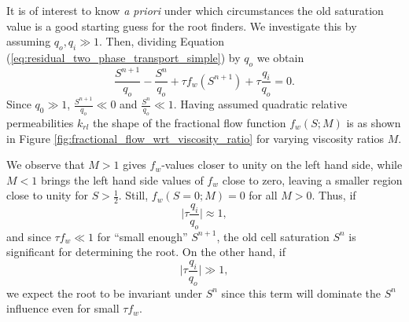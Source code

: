 It is of interest to know \emph{a priori} under which circumstances the old saturation value is a good starting guess for the root finders. We investigate this by assuming $q_o, q_i \gg 1$. Then, dividing Equation (\ref{eq:residual_two_phase_transport_simple}) by $q_o$ we obtain
\begin{equation*}
\frac{S^{n+1}}{q_o} - \frac{S^n}{q_o} + \tau f_w(S^{n+1}) + \tau \frac{q_i}{q_o} = 0.
\end{equation*}
Since $q_0 \gg 1$, $\frac{S^{n+1}}{q_o} \ll 0$ and $\frac{S^n}{q_o} \ll 1$. Having assumed quadratic relative permeabilities $k_{rl}$ the shape of the fractional flow function $f_w(S;M)$ is as shown in Figure \ref{fig:fractional_flow_wrt_viscosity_ratio} for varying viscosity ratios $M$. 

We observe that $M > 1$  gives $f_w$-values closer to unity on the left hand side, while $M < 1$ brings the left hand side values of $f_w$ close to zero, leaving a smaller region close to unity for $S > \frac{1}{2}$. Still, $f_w(S = 0;M) = 0$ for all $M > 0$. Thus, if 
\begin{equation*}
\lvert \tau \frac{q_i}{q_o} \rvert \approx  1,
\end{equation*} 
and since $\tau f_w \ll 1$ for ``small enough'' $S^{n+1}$, the old cell saturation $S^n$ is significant for determining the root. On the other hand, if 
\begin{equation*}
\lvert \tau \frac{q_i}{q_o} \rvert \gg 1,
\end{equation*}
we expect the root to be invariant under $S^n$ since this term will dominate the $S^n$ influence even for small $\tau f_w$.

